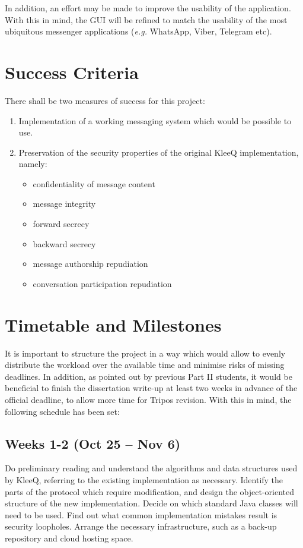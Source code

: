 \documentclass[a4paper, 12pt]{report}
\begin{document}
\begin{appendices}
\vspace{\baselineskip}
\noindent
In addition, an effort may be made to improve the usability of the application. With this in mind, the GUI will be refined to match the usability of the most ubiquitous messenger applications (\textit{e.g.} WhatsApp, Viber, Telegram etc).




\section{Success Criteria}
There shall be two measures of success for this project:
\begin{enumerate}
    \item Implementation of a working messaging system which would be possible to use.
    \item Preservation of the security properties of the original KleeQ implementation, namely:
        \begin{itemize}
            \item confidentiality of message content
            \item message integrity
            \item forward secrecy
            \item backward secrecy
            \item message authorship repudiation
            \item conversation participation repudiation
        \end{itemize}
\end{enumerate}




\section{Timetable and Milestones}
It is important to structure the project in a way which would allow to evenly distribute the workload over the available time and minimise risks of missing deadlines. In addition, as pointed out by previous Part II students, it would be beneficial to finish the dissertation write-up at least two weeks in advance of the official deadline, to allow more time for Tripos revision. With this in mind, the following schedule has been set:


\subsection*{Weeks 1-2 (Oct 25 -- Nov 6)}
Do preliminary reading and understand the algorithms and data structures used by KleeQ, referring to the existing implementation as necessary. Identify the parts of the protocol which require modification, and design the object-oriented structure of the new implementation. Decide on which standard Java classes will need to be used. Find out what common implementation mistakes result is security loopholes. Arrange the necessary infrastructure, such as a back-up repository and cloud hosting space.


\end{appendices}
\end{document}
